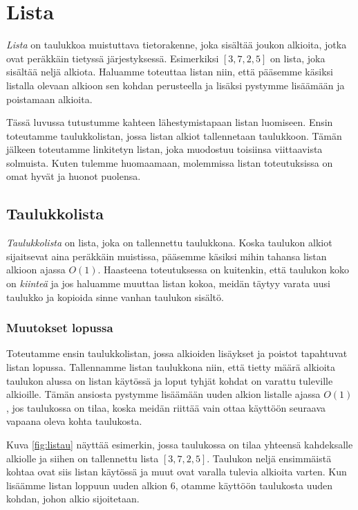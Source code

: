 \chapter{Lista}


\emph{Lista} on taulukkoa muistuttava tietorakenne,
joka sisältää joukon alkioita,
jotka ovat peräkkäin tietyssä järjestyksessä.
Esimerkiksi $[3,7,2,5]$ on lista, joka sisältää neljä alkiota.
Haluamme toteuttaa listan niin,
että pääsemme käsiksi listalla olevaan alkioon
sen kohdan perusteella
ja lisäksi pystymme lisäämään ja poistamaan alkioita.

Tässä luvussa tutustumme kahteen lähestymistapaan listan luomiseen.
Ensin toteutamme taulukkolistan,
jossa listan alkiot tallennetaan taulukkoon.
Tämän jälkeen toteutamme linkitetyn listan,
joka muodostuu toisiinsa viittaavista solmuista.
Kuten tulemme huomaamaan, molemmissa listan toteutuksissa on omat
hyvät ja huonot puolensa.

\section{Taulukkolista}


\emph{Taulukkolista} on lista, joka on tallennettu taulukkona.
Koska taulukon alkiot sijaitsevat aina peräkkäin muistissa,
pääsemme käsiksi mihin tahansa listan alkioon ajassa $O(1)$.
Haasteena toteutuksessa on kuitenkin,
että taulukon koko on \emph{kiinteä} ja jos haluamme
muuttaa listan kokoa, meidän täytyy varata uusi taulukko
ja kopioida sinne vanhan taulukon sisältö.

\subsection{Muutokset lopussa}

Toteutamme ensin taulukkolistan, jossa alkioiden
lisäykset ja poistot tapahtuvat listan lopussa.
Tallennamme listan taulukkona niin,
että tietty määrä alkioita taulukon alussa on listan käytössä
ja loput tyhjät kohdat on varattu tuleville alkioille.
Tämän ansiosta pystymme lisäämään uuden alkion listalle
ajassa $O(1)$, jos taulukossa on tilaa,
koska meidän riittää vain ottaa käyttöön seuraava
vapaana oleva kohta taulukosta.

Kuva \ref{fig:listau} näyttää esimerkin,
jossa taulukossa on tilaa yhteensä kahdeksalle alkiolle
ja siihen on tallennettu lista $[3,7,2,5]$.
Taulukon neljä ensimmäistä kohtaa ovat siis listan käytössä
ja muut ovat varalla tulevia alkioita varten.
Kun lisäämme listan loppuun uuden alkion 6,
otamme käyttöön taulukosta uuden kohdan, johon alkio sijoitetaan.

